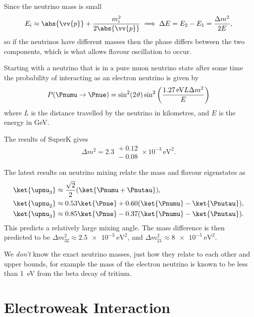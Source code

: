 \documentclass[fleqn]{NotesClass}
\begin{document}
    Since the neutrino mass is small
    \begin{equation}
        E_i \approx \abs{\vv{p}} + \frac{m_i^2}{2\abs{\vv{p}}} \implies \Delta E = E_2 - E_1 = \frac{\Delta m^2}{2E},
    \end{equation}
    so if the neutrinos have different masses then the phase differs between the two components, which is what allows flavour oscillation to occur.
    
    Starting with a neutrino that is in a pure muon neutrino state after some time the probability of interacting as an electron neutrino is given by
    \begin{equation}
        P(\Pnumu \to \Pnue) = \sin^2(2\vartheta) \sin^2\left( \frac{\qty{1.27}{\electronvolt} L \Delta m^2 }{E} \right)
    \end{equation}
    where \(L\) is the distance travelled by the neutrino in kilometres, and \(E\) is the energy in \unit{\giga\electronvolt}.
    
    The results of SuperK gives
    \begin{equation}
        \Delta m^2 = 2.3\substack{{}+0.12\\{}-0.08}\times 10^{-3} \,\unit{\electronvolt\squared}.
    \end{equation}
    
    The latest results on neutrino mixing relate the mass and flavour eigenstates as
    \begin{align}
        \ket{\upnu_3} &\approx \frac{\sqrt{2}}{2} (\ket{\Pnumu + \Pnutau}),\\
        \ket{\upnu_2} &\approx 0.53\ket{\Pnue} + 0.60(\ket{\Pnumu} - \ket{\Pnutau}),\\
        \ket{\upnu_3} &\approx 0.85\ket{\Pnue} - 0.37(\ket{\Pnumu} - \ket{\Pnutau}).\\
    \end{align}
    This predicts a relatively large mixing angle.
    The mass difference is then predicted to be \(\Delta m_{32}^2 \approx \qty{2.5e-3}{\electronvolt\squared}\), and \(\Delta m_{21}^2 \approx \qty{8e-5}{\electronvolt\squared}\).
    
    We \emph{don't} know the exact neutrino masses, just how they relate to each other and upper bounds, for example the mass of the electron neutrino is known to be less than \qty{1}{\electronvolt} from the beta decay of tritium.
    
    \part{Electroweak Interaction}
\end{document}
